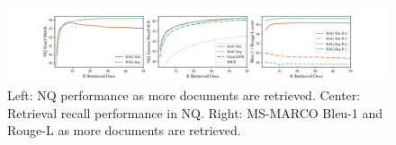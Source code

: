 \begin{figure}[h]
\centering

  \includegraphics[width=\textwidth]{images/retrieval_plots_flat.pdf}
  \vspace{-17pt}
\caption{Left: NQ performance as more documents are retrieved. Center: 
Retrieval recall performance in NQ.
Right: MS-MARCO Bleu-1 and Rouge-L as more documents are retrieved. 
    }
  \label{fig:n_docs_figures}
\end{figure}